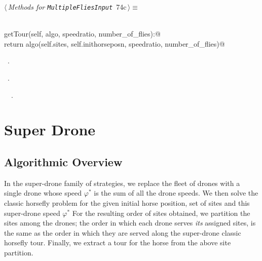 \documentclass[11.5pt]{report}
\begin{document}
\begin{flushleft} \small\label{scrap111}\raggedright\small
{} $\langle\,${\itshape Methods for \verb|MultipleFliesInput|}\nobreak\ {\footnotesize {74c}}$\,\rangle\equiv$
\vspace{-1ex}
\begin{list}{}{} \item
\mbox{}\verb@@\\
\mbox{}\verb@def getTour(self, algo, speedratio, number_of_flies):@\\
\mbox{}\verb@      return algo(self.sites, self.inithorseposn, speedratio, number_of_flies)@\\
\mbox{}\verb@@{\NWsep}
\end{list}
\vspace{-1.5ex}
\footnotesize
\begin{list}{}{\setlength{\itemsep}{-\parsep}\setlength{\itemindent}{-\leftmargin}}
\item \NWtxtMacroDefBy\ .
\item \NWtxtMacroRefIn\ .
\item \NWtxtIdentsDefed\nobreak\  \verb@getTour@\nobreak\ .
\item{}
\end{list}
\vspace{4ex}
\end{flushleft}


\section{ Super Drone}


\subsection{Algorithmic Overview} \hspace{0.2cm}
In the super-drone family of strategies, we replace the fleet of drones with a single drone 
whose speed $\varphi^{*}$ is the sum of all the drone speeds. We then solve the classic horsefly problem
for the given initial horse position, set of sites and this super-drone speed $\varphi^{*}$
For the resulting order of sites obtained, we partition the sites among the drones; 
the order in which each drone serves \textit{its} assigned sites, is the same 
as the order in which they are served along the super-drone classic horsefly tour. 
Finally, we extract a tour for the horse from the above site partition. 
\end{document}

